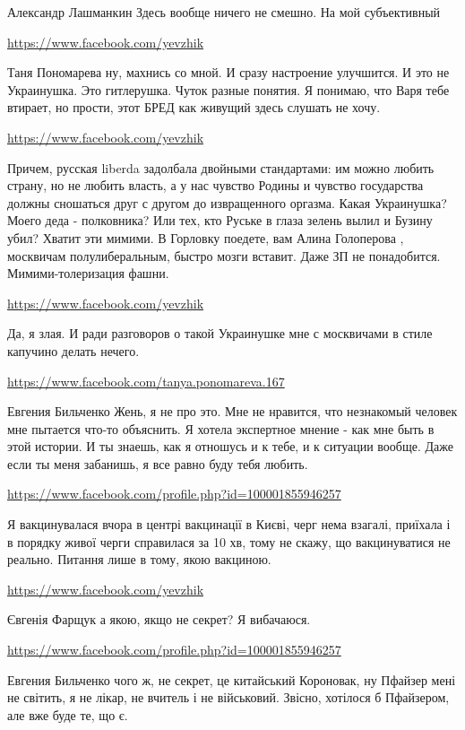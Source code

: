 \documentclass[a4paper,11pt]{extreport}
\begin{document}
\begin{itemize}
\begin{itemize}
Александр Лашманкин Здесь вообще ничего не смешно. На мой субъективный

\url{https://www.facebook.com/yevzhik}

Таня Пономарева ну, махнись со мной. И сразу настроение улучшится. И это не Украинушка. Это гитлерушка. Чуток разные понятия. Я понимаю, что Варя тебе втирает, но прости, этот БРЕД как живущий здесь слушать не хочу.

\url{https://www.facebook.com/yevzhik}

Причем, русская liberda задолбала двойными стандартами: им можно любить страну, но не любить власть, а у нас чувство Родины и чувство государства должны сношаться друг с другом до извращенного оргазма. Какая Украинушка? Моего деда - полковника? Или тех, кто Руське в глаза зелень вылил и Бузину убил? Хватит эти мимими. В Горловку поедете, вам Алина Голоперова , москвичам полулиберальным, быстро мозги вставит. Даже ЗП не понадобится. Мимими-толеризация фашни.

\url{https://www.facebook.com/yevzhik}

Да, я злая. И ради разговоров о такой Украинушке мне с москвичами в стиле капучино делать нечего.

\url{https://www.facebook.com/tanya.ponomareva.167}

Евгения Бильченко Жень, я не про это. Мне не нравится, что незнакомый человек мне пытается что-то объяснить. Я хотела экспертное мнение - как мне быть в этой истории. И ты знаешь, как я отношусь и к тебе, и к ситуации вообще. Даже если ты меня забанишь, я все равно буду тебя любить.

\end{itemize}
\url{https://www.facebook.com/profile.php?id=100001855946257}

Я вакцинувалася вчора в центрі вакцинації в Києві, черг нема взагалі, приїхала і в порядку живої черги справилася за 10 хв, тому не скажу, що вакцинуватися не реально. Питання лише в тому, якою вакциною.

\begin{itemize}
\url{https://www.facebook.com/yevzhik}

Євгенія Фарщук а якою, якщо не секрет? Я вибачаюся.

\url{https://www.facebook.com/profile.php?id=100001855946257}

Евгения Бильченко чого ж, не секрет, це китайський Короновак, ну Пфайзер мені не світить, я не лікар, не вчитель і не військовий. Звісно, хотілося б Пфайзером, але вже буде те, що є.


\end{itemize}
\end{itemize}
\end{document}
